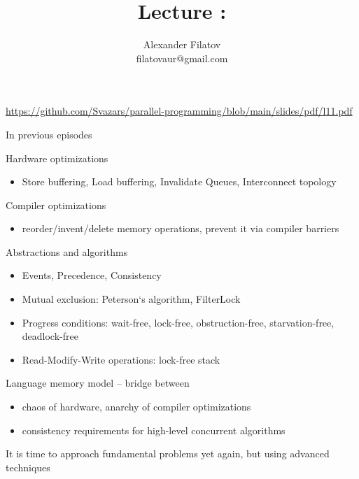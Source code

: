 



\title[]{Lecture \advancedConcurrencyNum: \advancedConcurrencyTopic}
\subtitle[]{\advancedConcurrencyKey}
\author[]{Alexander Filatov\\ filatovaur@gmail.com}

\date{}



\begin{frame}
  \titlepage
  \url{https://github.com/Svazars/parallel-programming/blob/main/slides/pdf/l11.pdf}
\end{frame}


\begin{frame}{In previous episodes}

Hardware optimizations
\begin{itemize}
 \item Store buffering, Load buffering, Invalidate Queues, Interconnect topology
\end{itemize}

Compiler optimizations
\begin{itemize}
 \item reorder/invent/delete memory operations, prevent it via compiler barriers
\end{itemize}

Abstractions and algorithms
\begin{itemize} 
 \item Events, Precedence, Consistency
 \item Mutual exclusion: Peterson`s algorithm, FilterLock  
 \item Progress conditions: wait-free, lock-free, obstruction-free, starvation-free, deadlock-free 
 \item Read-Modify-Write operations: lock-free stack
\end{itemize}

Language memory model -- bridge between
\begin{itemize}  
    \item chaos of hardware, anarchy of compiler optimizations    
    \item consistency requirements for high-level concurrent algorithms       
\end{itemize}

\pause
It is time to approach fundamental problems yet again, but using advanced techniques

\end{frame}

